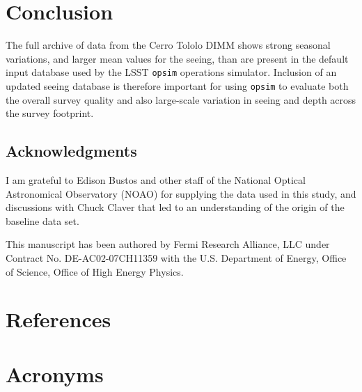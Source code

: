 \documentclass[DM,authoryear,toc]{lsstdoc}
\begin{document}

\section{Conclusion}
\label{sec:conclusion}

The full archive of data from the Cerro Tololo DIMM shows strong
seasonal variations, and larger mean values for the seeing, than are
present in the default input database used by the LSST \texttt{opsim}
operations simulator. Inclusion of an updated seeing database is
therefore important for using \texttt{opsim} to evaluate both the
overall survey quality and also large-scale variation in seeing and
depth across the survey footprint.


\subsection*{Acknowledgments}

I am grateful to Edison Bustos and other staff of the National Optical
Astronomical Observatory (NOAO) for supplying the data used in this
study, and discussions with Chuck Claver that led to an understanding
of the origin of the baseline data set.

This manuscript has been authored by Fermi Research Alliance, LLC
under Contract No. DE-AC02-07CH11359 with the U.S. Department of
Energy, Office of Science, Office of High Energy Physics.



\appendix
\section{References} \label{sec:bib}
\renewcommand{\refname}{} %


\section{Acronyms} \label{sec:acronyms}

\end{document}
